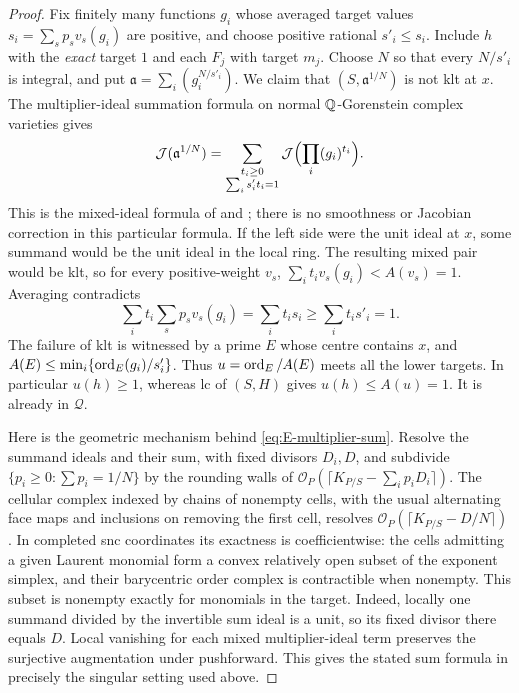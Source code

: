 \begin{proof}
Fix finitely many functions $g_i$ whose averaged target values
$s_i=\sum_s p_sv_s(g_i)$ are positive, and choose positive rational
$s'_i\le s_i$. Include $h$ with the \emph{exact} target $1$ and each
$F_j$ with target $m_j$. Choose $N$ so that every $N/s'_i$ is integral,
and put $\mathfrak a=\sum_i(g_i^{N/s'_i})$. We claim that
$(S,\mathfrak a^{1/N})$ is not klt at $x$.
The multiplier-ideal summation formula on normal $\mathbb Q$-Gorenstein
complex varieties gives
\begin{equation}\label{eq:E-multiplier-sum}
 \mathcal J(\mathfrak a^{1/N})
 =\sum_{\substack{t_i\ge0\\\sum_i s'_it_i=1}}
       \mathcal J\Bigl(\prod_i(g_i)^{t_i}\Bigr).
\end{equation}
This is the mixed-ideal formula of
\cite[Theorem~3.2]{Takagi} and
\cite[Corollary~2 and Theorem~3.6]{JowMiller}; there is no smoothness
or Jacobian correction in this particular formula.
If the left side were the unit ideal at $x$, some summand would be the
unit ideal in the local ring. The resulting mixed pair would be klt,
so for every positive-weight $v_s$,
$\sum_i t_i v_s(g_i)<A(v_s)=1$. Averaging contradicts
\[
 \sum_i t_i\sum_s p_s v_s(g_i)=\sum_i t_is_i
       \ge\sum_i t_is'_i=1.
\]
The failure of klt is witnessed by a prime $E$ whose centre contains
$x$, and
$A(E)\le\min_i\{\operatorname{ord}_E(g_i)/s'_i\}$.
Thus $u=\operatorname{ord}_E/A(E)$ meets all the lower targets. In particular
$u(h)\ge1$, whereas lc of $(S,H)$ gives $u(h)\le A(u)=1$.
It is already in $\mathcal Q$.

Here is the geometric mechanism behind \eqref{eq:E-multiplier-sum}.
Resolve the summand ideals and their sum, with fixed divisors $D_i,D$,
and subdivide $\{p_i\ge0:\sum p_i=1/N\}$ by the rounding walls of
$\mathcal O_P(\lceil K_{P/S}-\sum_i p_iD_i\rceil)$.
The cellular complex indexed by chains of nonempty cells, with the
usual alternating face maps and inclusions on removing the first
cell, resolves
$\mathcal O_P(\lceil K_{P/S}-D/N\rceil)$.
In completed snc coordinates its exactness is coefficientwise:
the cells admitting a given Laurent monomial form a convex relatively
open subset of the exponent simplex, and their barycentric order
complex is contractible when nonempty. This subset is nonempty exactly
for monomials in the target. Indeed, locally one summand divided by
the invertible sum ideal is a unit, so its fixed divisor there equals
$D$. Local vanishing for each mixed multiplier-ideal term preserves
the surjective augmentation under pushforward. This gives the stated
sum formula in precisely the singular setting used above.


\end{proof}
